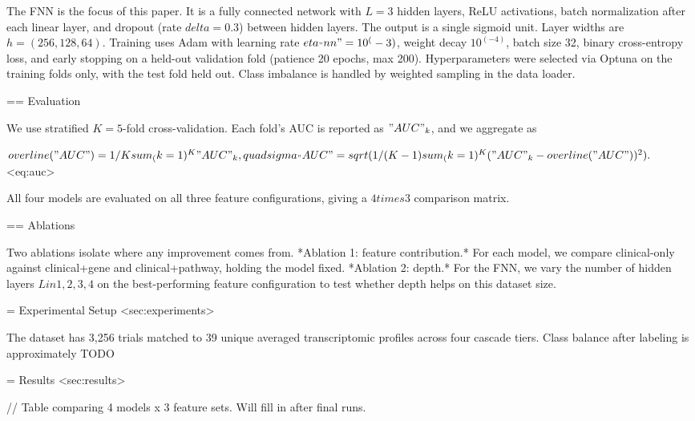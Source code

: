 The FNN is the focus of this paper. It is a fully connected network with $L = 3$ hidden layers, ReLU activations, batch normalization after each linear layer, and dropout (rate $delta = 0.3$) between hidden layers. The output is a single sigmoid unit. Layer widths are $h = (256, 128, 64)$. Training uses Adam with learning rate $eta_"nn" = 10^(-3)$, weight decay $10^(-4)$, batch size 32, binary cross-entropy loss, and early stopping on a held-out validation fold (patience 20 epochs, max 200). Hyperparameters were selected via Optuna on the training folds only, with the test fold held out. Class imbalance is handled by weighted sampling in the data loader.

== Evaluation

We use stratified $K = 5$-fold cross-validation. Each fold's AUC is reported as $"AUC"_k$, and we aggregate as

$ overline("AUC") = 1/K sum_(k=1)^K "AUC"_k, quad sigma_"AUC" = sqrt(1/(K-1) sum_(k=1)^K ("AUC"_k - overline("AUC"))^2). $ <eq:auc>

All four models are evaluated on all three feature configurations, giving a $4 times 3$ comparison matrix.

== Ablations

Two ablations isolate where any improvement comes from. *Ablation 1: feature contribution.* For each model, we compare clinical-only against clinical+gene and clinical+pathway, holding the model fixed. *Ablation 2: depth.* For the FNN, we vary the number of hidden layers $L in {1, 2, 3, 4}$ on the best-performing feature configuration to test whether depth helps on this dataset size.


= Experimental Setup <sec:experiments>

The dataset has 3,256 trials matched to 39 unique averaged transcriptomic profiles across four cascade tiers. Class balance after labeling is approximately TODO%


= Results <sec:results>

// Table comparing 4 models x 3 feature sets. Will fill in after final runs.


